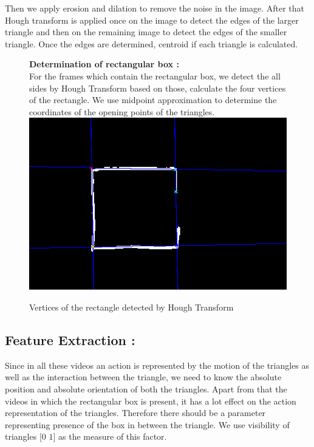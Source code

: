 \documentclass[10pt, twocolumn]{article}
\begin{document}
Then we apply erosion and dilation to remove the noise in the image. After that Hough transform is applied once on the image to detect the edges of the larger triangle and then on the remaining image to detect the edges of the smaller triangle. Once the edges are determined, centroid if each triangle is calculated.\\
\begin{figure}[H]
{\bf Determination of rectangular box :} \\
 \hspace*{10pt} For the frames which contain the rectangular box, we detect the all sides by Hough Transform based on those, calculate the four vertices of the rectangle. We use midpoint approximation to determine the coordinates of the opening points of the triangles. 
\center
\includegraphics[scale=0.3]{rectCoax.png}
\caption{Vertices of the rectangle detected by Hough Transform}
\end{figure}

\subsection*{Feature Extraction :}
\hspace*{10pt} Since in all these videos an action is represented by the motion of the triangles as well as the interaction between the triangle, we need to know the absolute position and absolute orientation of both the triangles. Apart from that the videos in which the rectangular box is present, it has a lot effect on the action representation of the triangles. Therefore there should be a parameter representing presence of the box in between the triangle. We use visibility of triangles $[0$ $1]$ as the measure of this factor.
\end{document}
